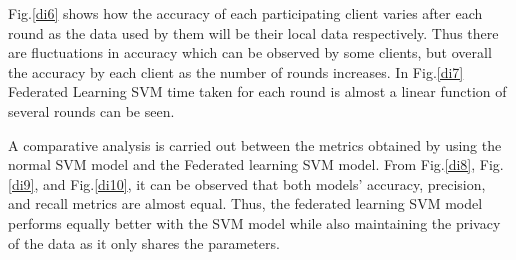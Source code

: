 \documentclass[conference]{IEEEtran}
\begin{document}
Fig.\ref{di6} shows how the accuracy of each participating client 
varies after each round as the data used by them will be their local data respectively. Thus there are fluctuations in accuracy which can be observed by some clients, but overall the accuracy by each client as the number of rounds increases. In Fig.\ref{di7} Federated Learning SVM time taken for each round is almost a linear function of several rounds can be seen.





A comparative analysis is carried out between the metrics obtained by using the normal SVM model and the Federated learning SVM model. From Fig.\ref{di8}, Fig.\ref{di9}, and Fig.\ref{di10}, it can be observed that both models' accuracy, precision, and recall metrics are almost equal. Thus, the federated learning SVM model performs equally better with the SVM model while also maintaining the privacy of the data as it only shares the parameters.
\end{document}
